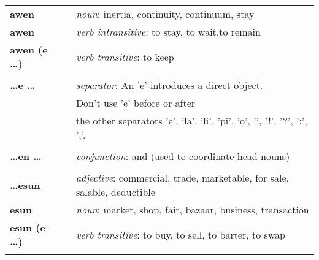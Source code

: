 \begin{supertabular}{p{2,5cm}|ll}
    \textbf{awen}                &  & \textit{noun}: inertia, continuity, continuum, stay                                                        \\
    \textbf{awen}                &  & \textit{verb intransitive}: to stay, to wait,to remain                                                     \\
    \textbf{awen (e \dots)}      &  & \textit{verb transitive}: to keep                                                                          \\
                                 &  &                                                                                                            \\
    \textbf{\dots e \dots}       &  & \textit{separator}: An 'e' introduces a direct object.                                                     \\
                                 &  & Don't use 'e' before or after                                                                              \\
                                 &  & the other separators 'e', 'la', 'li', 'pi', 'o', '.', '!', '?', ':', ','.                                  \\
                                 &  &                                                                                                            \\
    \textbf{\dots en \dots}      &  & \textit{conjunction}: and (used to coordinate head nouns)                                                  \\
                                 &  &                                                                                                            \\
    \textbf{\dots esun}          &  & \textit{adjective}: commercial, trade, marketable, for sale, salable, deductible                           \\
    \textbf{esun}                &  & \textit{noun}: market, shop, fair, bazaar, business, transaction                                           \\
    \textbf{esun (e \dots)}      &  & \textit{verb transitive}: to buy, to sell, to barter, to swap                                              \\
                                 &  &                                                                                                            \\

\end{supertabular}

